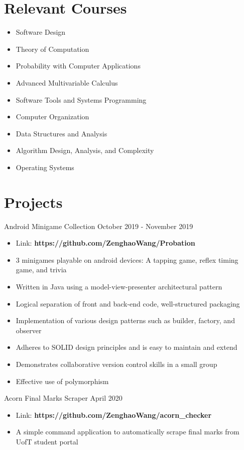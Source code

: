 \documentclass[letter]{res}
\begin{document}
\begin{resume}
    \section{Relevant Courses}
    \begin{itemize}
        \item Software Design
        \item Theory of Computation
        \item Probability with Computer Applications
        \item Advanced Multivariable Calculus
        \item Software Tools and Systems Programming
        \item Computer Organization
        \item Data Structures and Analysis
        \item Algorithm Design, Analysis, and Complexity
        \item Operating Systems
    \end{itemize}

    \section{Projects}
    Android Minigame Collection  \hfill October 2019 - November 2019\\
    \vspace{-2mm}
    \begin{itemize}
        \item Link: \textbf{https://github.com/ZenghaoWang/Probation}
        \item 3 minigames playable on android devices: A tapping game, reflex timing game, and trivia
        \item Written in Java using a model-view-presenter architectural pattern
        \item Logical separation of front and back-end code, well-structured packaging
        \item Implementation of various design patterns such as builder, factory, and observer
        \item Adheres to SOLID design principles and is easy to maintain and extend
        \item Demonstrates collaborative version control skills in a small group
        \item Effective use of polymorphism

    \end{itemize}
    Acorn Final Marks Scraper \hfill April 2020\\
    \vspace{-2mm}
    \begin{itemize}
        \item Link: \textbf{https://github.com/ZenghaoWang/acorn\_checker}
        \item A simple command application to automatically scrape final marks from UofT student portal
    \end{itemize}

\end{resume}
\end{document}
